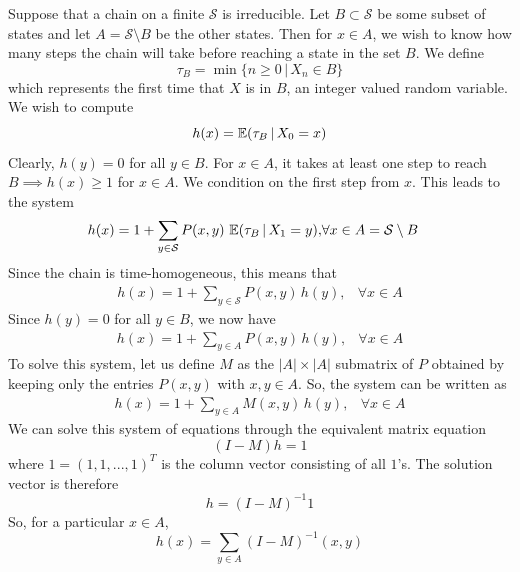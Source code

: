 	\begin{example}
		Suppose that a chain on a finite $\mathcal{S}$ is irreducible. Let $B \subset \mathcal{S}$ be some subset of states and let $A = \mathcal{S} \setminus B$ be the other states. Then for $x \in A$, we wish to know how many steps the chain will take before reaching a state in the set $B$. We define 
		\begin{equation}
			\tau_B = \min\{n \geq 0 \,|\, X_n \in B\}
		\end{equation}
		which represents the first time that $X$ is in $B$, an integer valued random variable. We wish to compute
		\begin{equation}
			h(x) = \operatorname{\mathbb{E}}(\tau_B \,|\, X_0 = x)
		\end{equation}
		Clearly, $h(y) = 0$ for all $y \in B$. For $x \in A$, it takes at least one step to reach $B \implies h(x) \geq 1$ for $x \in A$. We condition on the first step from $x$. This leads to the system 
		\begin{align*}
			h(x) = 1 + \sum_{y \in \mathcal{S}} P(x, y) \, \operatorname{\mathbb{E}}(\tau_B \,|\, X_1 = y), & \forall x \in A = \mathcal{S} \setminus B
		\end{align*}
		Since the chain is time-homogeneous, this means that
		\begin{align*}
			h(x) = 1 + \sum_{y \in \mathcal{S}} P(x, y) \, h(y), & \forall x \in A 
		\end{align*}
		Since $h(y) = 0$ for all $y \in B$, we now have
		\begin{align*}
			h(x) = 1 + \sum_{y \in A} P(x, y) \, h(y), & \forall x \in A 
		\end{align*}
		To solve this system, let us define $M$ as the $|A| \times |A|$ submatrix of $P$ obtained by keeping only the entries $P(x, y)$ with $x, y \in A$. So, the system can be written as
		\begin{align*}
			h(x) = 1 + \sum_{y \in A} M(x, y) \, h(y), & \forall x \in A
		\end{align*}
		We can solve this system of equations through the equivalent matrix equation
		\begin{equation}
			(I - M) h = 1
		\end{equation}
		where $1 = (1, 1, ..., 1)^T$ is the column vector consisting of all $1$'s. The solution vector is therefore
		\begin{equation}
			h = (I - M)^{-1} 1
		\end{equation}
		So, for a particular $x \in A$, 
		\begin{equation}
			h(x) = \sum_{y \in A} (I - M)^{-1} (x, y)
		\end{equation}


\end{example}
